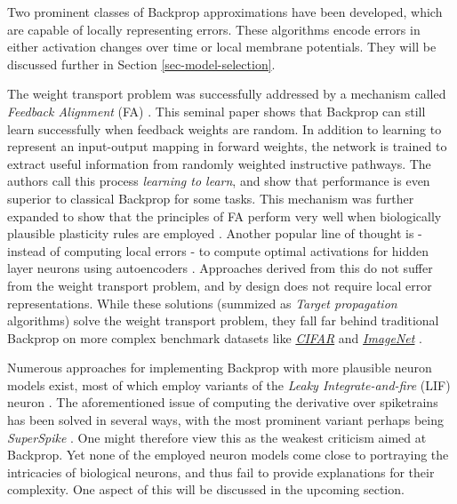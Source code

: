 Two prominent classes of Backprop approximations have been developed, which are capable of locally representing errors.
These algorithms encode errors in either activation changes over time or local membrane potentials. They will be
discussed further in Section \ref{sec-model-selection}.\newline


\noindent The weight transport problem was successfully addressed by a mechanism called \textit{Feedback Alignment} (FA)
\citep{Lillicrap2014}. This seminal paper shows that Backprop can still learn successfully when feedback weights are
random. In addition to learning to represent an input-output mapping in forward weights, the network is trained to
extract useful information from randomly weighted instructive pathways. The authors call this process \textit{learning
  to learn}, and show that performance is even superior to classical Backprop for some tasks. This mechanism was further
expanded to show that the principles of FA perform very well when biologically plausible plasticity rules are employed
\citep{Liao2016,Zenke2018}. Another popular line of thought is - instead of computing local errors - to compute optimal
activations for hidden layer neurons using autoencoders \citep{Bengio2014,Lee2015,Ahmad2020}. Approaches derived from
this do not suffer from the weight transport problem, and by design does not require local error representations. While
these solutions (summized as \textit{Target propagation} algorithms) solve the weight transport problem, they fall far
behind traditional Backprop on more complex benchmark datasets like
\textit{\href{https://www.cs.toronto.edu/~kriz/cifar.html}{CIFAR}} and
\textit{\href{https://www.image-net.org/index.php}{ImageNet}} \citep{Bartunov2018}.\newline

\noindent Numerous approaches for implementing Backprop with more plausible neuron models exist, most of which employ
variants of the \textit{Leaky Integrate-and-fire} (LIF) neuron \citep{Sporea2013,Lee2016,Bengio2017,Lee2020}. The
aforementioned issue of computing the derivative over spiketrains has been solved in several ways, with the most
prominent variant perhaps being \textit{SuperSpike} \citep{Zenke2018}. One might therefore view this as the weakest
criticism aimed at Backprop. Yet none of the employed neuron models come close to portraying the intricacies of
biological neurons, and thus fail to provide explanations for their complexity. One aspect of this will be discussed in
the upcoming section.\newline

